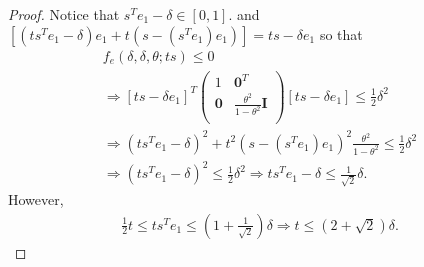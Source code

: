 \begin{proof}

Notice that $s^Te_1 - \delta \in \left[0, 1\right]$.
and $\left[\left(ts^Te_1 - \delta\right) e_1 + t\left(s - \left(s^Te_1\right) e_1\right)\right] = ts - \delta e_1$
so that
\begin{align*}
f_e(\delta, \delta, \theta; ts) \le 0 \\
\Longrightarrow 
\left[ts - \delta e_1\right]^T\begin{pmatrix}
1 & \boldsymbol0^T \\
\boldsymbol 0 & \frac{\theta^2}{1 - \theta^2} \boldsymbol I \\
\end{pmatrix} \left[ts - \delta e_1\right] \le \frac 1 2 \delta^2 \\
\Longrightarrow
\left(ts^Te_1 - \delta\right)^2 + t^2\left(s - \left(s^Te_1\right) e_1\right)^2  \frac{\theta^2}{1 - \theta^2} \le \frac 1 2 \delta^2 \\
\Longrightarrow 
\left(t s^Te_1 - \delta\right)^2 \le \frac 1 2 \delta^2 
\Longrightarrow t s^Te_1 - \delta \le \frac 1 {\sqrt{2}} \delta.
\end{align*}
However,
\begin{align*}
\frac 1 2 t \le t s^Te_1 \le \left(1 + \frac 1 {\sqrt{2}}\right) \delta
\Longrightarrow t \le \left(2 + \sqrt{2}\right) \delta.
\end{align*}
\end{proof}





